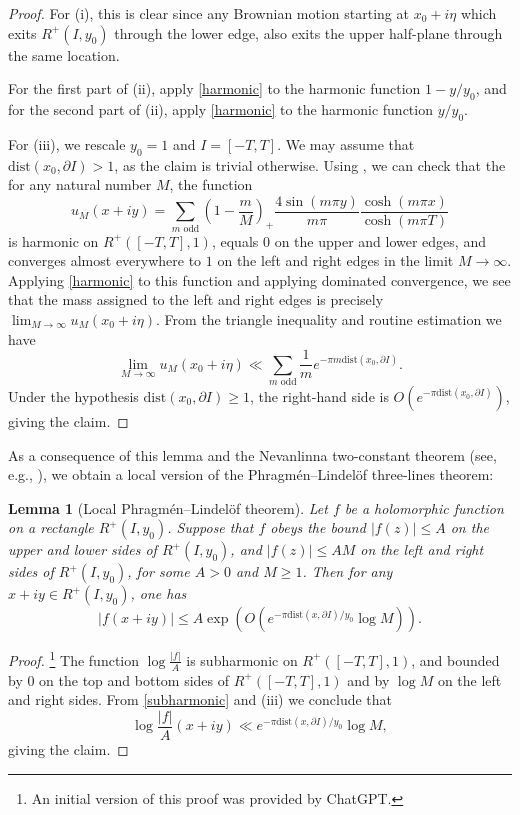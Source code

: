 \documentclass[12pt]{amsart}
\newtheorem{lemma}[theorem]{Lemma}
\begin{document}
\begin{proof}  For (i), this is clear since any Brownian motion starting at $x_0+i\eta$ which exits $R^+(I,y_0)$ through the lower edge, also exits the upper half-plane through the same location.

For the first part of (ii), apply \eqref{harmonic} to the harmonic function $1 - y / y_0$, and for the second part of (ii), apply \eqref{harmonic} to the harmonic function $y / y_0$.

For (iii), we rescale $y_0 = 1$ and $I = [-T,T]$.  We may assume that $\mathrm{dist}(x_0,\partial I) > 1$, as the claim is trivial otherwise. Using , we can check that the for any natural number $M$, the function
$$ u_M(x+iy) = \sum_{m \text{ odd}} \left(1-\frac{m}{M}\right)_+ \frac{4\sin(m\pi y)}{m\pi}  \frac{\cosh(m\pi x)}{\cosh(m \pi T)}$$
is harmonic on $R^+([-T,T],1)$, equals $0$ on the upper and lower edges, and converges almost everywhere to $1$ on the left and right edges in the limit $M \to \infty$.  Applying \eqref{harmonic} to this function and applying dominated convergence, we see that the mass assigned to the left and right edges is precisely $\lim_{M \to \infty} u_M(x_0+i\eta)$.  From the triangle inequality and routine estimation we have
$$ \lim_{M \to \infty} u_M(x_0+i\eta) \ll \sum_{m \text{ odd}} \frac{1}{m} e^{-\pi m \mathrm{dist}(x_0, \partial I) }.$$
Under the hypothesis $\mathrm{dist}(x_0, \partial I) \geq 1$, the right-hand side is $O( e^{-\pi \mathrm{dist}(x_0, \partial I)})$, giving the claim.\end{proof}

As a consequence of this lemma and the Nevanlinna two-constant theorem (see, e.g., \cite{garnett}), we obtain a local version of the
Phragm\'en--Lindel\"of three-lines theorem:

\begin{lemma}[Local Phragm\'en--Lindel\"of theorem]\label{tpl}  Let $f$ be a holomorphic function on a rectangle $R^+(I,y_0)$. Suppose that $f$ obeys the bound $|f(z)| \leq A$ on the upper and lower sides of $R^+(I,y_0)$, and $|f(z)| \leq AM$ on the left and right sides of $R^+(I,y_0)$, for some $A > 0$ and $M \geq 1$.  Then for any $x+iy \in R^+(I,y_0)$, one has
$$ |f(x+iy)| \leq A \exp\left( O(e^{-\pi \mathrm{dist}(x, \partial I) / y_0} \log M) \right).$$
\end{lemma}

\begin{proof}\footnote{An initial version of this proof was provided by ChatGPT.}  The function $\log \frac{|f|}{A}$ is subharmonic on $R^+([-T,T],1)$, and bounded by $0$ on the top and bottom sides of $R^+([-T,T],1)$ and by $\log M$ on the left and right sides.  From \eqref{subharmonic} and (iii) we conclude that
$$\log \frac{|f|}{A}(x+iy) \ll e^{-\pi \mathrm{dist}(x, \partial I) / y_0} \log M,$$
giving the claim.
\end{proof}
\end{document}
